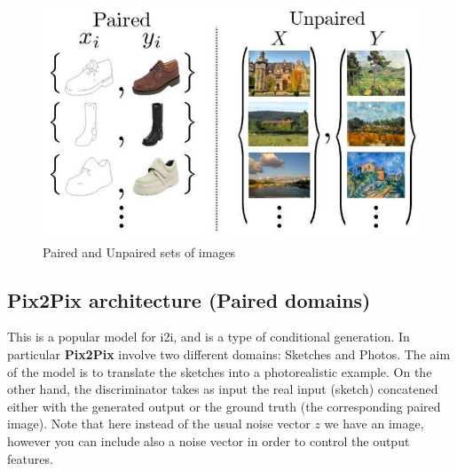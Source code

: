 \begin{figure}[h]
    \centering
    \includegraphics[scale=0.5]{img/pairedunpaired.png}
    \caption{Paired and Unpaired sets of images}
\end{figure}

\subsection{Pix2Pix architecture (Paired domains)}
This is a popular model for i2i, and is a type of conditional generation. In particular \textbf{Pix2Pix} involve two different domains: Sketches and Photos. The aim of the model is to translate the sketches into a photorealistic example. On the other hand, the discriminator takes as input the real input (sketch) concatened either with the generated output or the ground truth (the corresponding paired image). Note that here instead of the usual noise vector $z$ we have an image, however you can include also a noise vector in order to control the output features.

